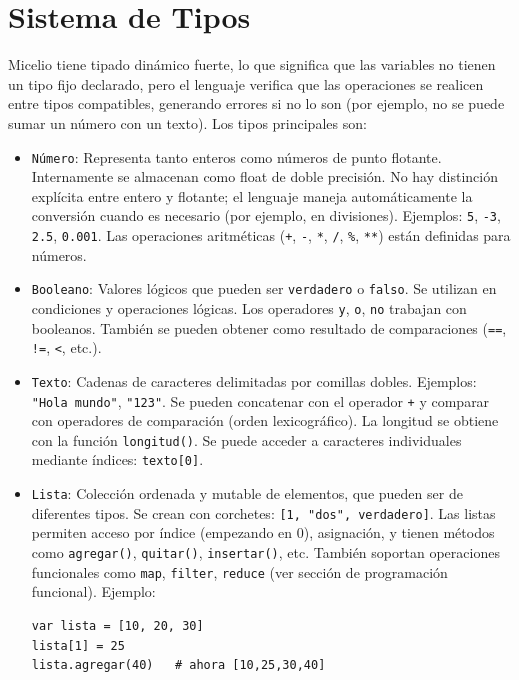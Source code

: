 \documentclass[12pt]{article}
\begin{document}
\section{Sistema de Tipos}

Micelio tiene tipado dinámico fuerte, lo que significa que las variables no tienen un tipo fijo declarado, pero el lenguaje verifica que las operaciones se realicen entre tipos compatibles, generando errores si no lo son (por ejemplo, no se puede sumar un número con un texto). Los tipos principales son:

\begin{itemize}
    \item \texttt{Número}: Representa tanto enteros como números de punto flotante. Internamente se almacenan como float de doble precisión. No hay distinción explícita entre entero y flotante; el lenguaje maneja automáticamente la conversión cuando es necesario (por ejemplo, en divisiones). Ejemplos: \texttt{5}, \texttt{-3}, \texttt{2.5}, \texttt{0.001}. Las operaciones aritméticas (\texttt{+}, \texttt{-}, \texttt{*}, \texttt{/}, \texttt{\%}, \texttt{**}) están definidas para números.

    \item \texttt{Booleano}: Valores lógicos que pueden ser \texttt{verdadero} o \texttt{falso}. Se utilizan en condiciones y operaciones lógicas. Los operadores \texttt{y}, \texttt{o}, \texttt{no} trabajan con booleanos. También se pueden obtener como resultado de comparaciones (\texttt{==}, \texttt{!=}, \texttt{<}, etc.).

    \item \texttt{Texto}: Cadenas de caracteres delimitadas por comillas dobles. Ejemplos: \texttt{"Hola mundo"}, \texttt{"123"}. Se pueden concatenar con el operador \texttt{+} y comparar con operadores de comparación (orden lexicográfico). La longitud se obtiene con la función \texttt{longitud()}. Se puede acceder a caracteres individuales mediante índices: \texttt{texto[0]}.

    \item \texttt{Lista}: Colección ordenada y mutable de elementos, que pueden ser de diferentes tipos. Se crean con corchetes: \texttt{[1, "dos", verdadero]}. Las listas permiten acceso por índice (empezando en 0), asignación, y tienen métodos como \texttt{agregar()}, \texttt{quitar()}, \texttt{insertar()}, etc. También soportan operaciones funcionales como \texttt{map}, \texttt{filter}, \texttt{reduce} (ver sección de programación funcional). Ejemplo:
    \begin{lstlisting}
var lista = [10, 20, 30]
lista[1] = 25
lista.agregar(40)   # ahora [10,25,30,40]
    \end{lstlisting}


\end{itemize}
\end{document}
